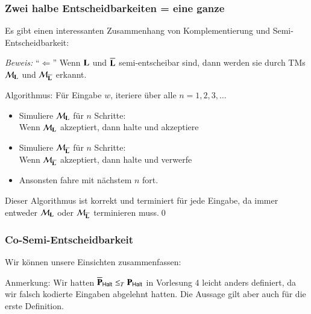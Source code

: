 \documentclass[onlymath]{beamer}
\begin{document}
\begin{frame}[t]\frametitle{Zwei halbe Entscheidbarkeiten = eine ganze}

Es gibt einen interessanten Zusammenhang von Komplementierung und Semi-Entscheidbarkeit:\\[1ex]


\emph{Beweis:} "`$\Leftarrow$"' Wenn $\textbf{\textcolor{black}{L}}$ und $\overline{\textbf{\textcolor{black}{L}}}$ semi-entscheibar sind, dann werden sie durch TMs $\mathcal{M}_{\textbf{\textcolor{black}{L}}}$ und
$\mathcal{M}_{\overline{\textbf{\textcolor{black}{L}}}}$ erkannt.\pause\medskip

Algorithmus: Für Eingabe $w$, iteriere über alle $n=1,2,3,\ldots$
\begin{itemize}
\item Simuliere $\mathcal{M}_{\textbf{\textcolor{black}{L}}}$ für $n$ Schritte:\\
	Wenn $\mathcal{M}_{\textbf{\textcolor{black}{L}}}$ akzeptiert, dann halte und akzeptiere
\item Simuliere $\mathcal{M}_{\overline{\textbf{\textcolor{black}{L}}}}$ für $n$ Schritte:\\
	Wenn $\mathcal{M}_{\overline{\textbf{\textcolor{black}{L}}}}$ akzeptiert, dann halte und verwerfe
\item Ansonsten fahre mit nächstem $n$ fort.
\end{itemize}
Dieser Algorithmus ist korrekt und terminiert für jede Eingabe, da immer
entweder $\mathcal{M}_{\textbf{\textcolor{black}{L}}}$ oder
$\mathcal{M}_{\overline{\textbf{\textcolor{black}{L}}}}$ terminieren muss.\qed

\end{frame}

\begin{frame}\frametitle{Co-Semi-Entscheidbarkeit}

Wir können unsere Einsichten zusammenfassen:\bigskip

\bigskip\pause


{\footnotesize
\textcolor{devilscss}{Anmerkung: Wir hatten $\overline{\textbf{\textcolor{black}{P}}}_{\textsf{Halt}}\leq_T \textbf{\textcolor{black}{P}}_{\textsf{Halt}}$ in Vorlesung 4 leicht anders definiert, da wir falsch kodierte Eingaben abgelehnt hatten. Die Aussage gilt aber auch für die erste Definition.}

}

\end{frame}
\end{document}

